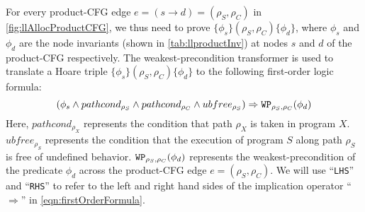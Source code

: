 For every product-CFG edge $e = (s\rightarrow d) = (\rho_S,\rho_C)$
in \cref{fig:llAllocProductCFG}, we thus
need to prove
$\{\phi_s\} (\rho_S,\rho_C) \{\phi_d\}$, where $\phi_s$ and $\phi_d$
are the node invariants
(shown
in \cref{tab:llproductInv})
at nodes $s$ and $d$ of the product-CFG respectively.
The weakest-precondition transformer
is used to translate a Hoare triple $\{\phi_s\} (\rho_S,\rho_C) \{\phi_d\}$
to the following first-order logic formula:
\begin{equation}\label{eqn:firstOrderFormula}
(\phi_s \land pathcond_{\rho_S} \land pathcond_{\rho_C} \land ubfree_{\rho_S}) \Rightarrow {\tt WP}_{{\rho_S,\rho_C}}(\phi_d)
\end{equation}
Here, $pathcond_{\rho_X}$ represents the condition that
path $\rho_X$ is taken in program $X$.
$ubfree_{\rho_S}$ represents the condition that
the execution of program $S$ along path $\rho_S$ is
free of undefined behavior.
${\tt WP}_{{\rho_S,\rho_C}}(\phi_d)$ represents the weakest-precondition
of the predicate $\phi_d$ across the product-CFG edge $e = (\rho_S,\rho_C)$.
We will use ``{\tt LHS}'' and ``{\tt RHS}'' to
refer to the left and right hand sides of the
implication operator ``$\Rightarrow$'' in \cref{eqn:firstOrderFormula}.

